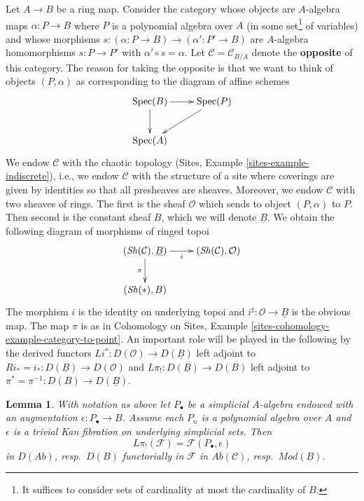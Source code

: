 \documentclass{stacks-project}
\theoremstyle{plain}
\newtheorem{lemma}[subsection]{Lemma}
\theoremstyle{definition}
\theoremstyle{remark}
\numberwithin{equation}{subsection}
\def\Spec{\mathop{\mathrm{Spec}}}
\def\Sh{\mathop{\mathit{Sh}}\nolimits}
\begin{document}
\noindent
Let $A \to B$ be a ring map. Consider the category whose objects are
$A$-algebra maps $\alpha : P \to B$ where $P$ is a polynomial algebra over $A$
(in some set\footnote{It suffices to consider sets of cardinality
at most the cardinality of $B$.} of variables) and whose
morphisms $s : (\alpha : P \to B) \to (\alpha' : P' \to B)$ are
$A$-algebra homomorphisms $s : P \to P'$ with $\alpha' \circ s = \alpha$.
Let $\mathcal{C} = \mathcal{C}_{B/A}$ denote the {\bf opposite}
of this category. The reason for
taking the opposite is that we want to think of objects
$(P, \alpha)$ as corresponding to the diagram of affine schemes
$$
\xymatrix{
\Spec(B) \ar[d] \ar[r] & \Spec(P) \ar[ld] \\
\Spec(A)
}
$$
We endow $\mathcal{C}$ with the chaotic topology
(Sites, Example \ref{sites-example-indiscrete}), i.e., we endow
$\mathcal{C}$ with the structure of a site where coverings are given by
identities so that all presheaves are sheaves.
Moreover, we endow $\mathcal{C}$ with two sheaves of rings. The first
is the sheaf $\mathcal{O}$ which sends to object $(P, \alpha)$ to $P$.
Then second is the constant sheaf $B$, which we will denote
$\underline{B}$. We obtain the following diagram of morphisms of
ringed topoi
\begin{equation}
\label{equation-pi}
\vcenter{
\xymatrix{
(\Sh(\mathcal{C}), \underline{B}) \ar[r]_i \ar[d]_\pi &
(\Sh(\mathcal{C}), \mathcal{O}) \\
(\Sh(*), B)
}
}
\end{equation}
The morphism $i$ is the identity on underlying topoi and
$i^\sharp : \mathcal{O} \to \underline{B}$ is the obvious map.
The map $\pi$ is as in Cohomology on Sites, Example
\ref{sites-cohomology-example-category-to-point}.
An important role will be played in the following
by the derived functors
$
Li^* : D(\mathcal{O}) \longrightarrow D(\underline{B})
$
left adjoint to $Ri_* = i_* : D(\underline{B}) \to D(\mathcal{O})$ and
$
L\pi_! : D(\underline{B}) \longrightarrow D(B)
$
left adjoint to $\pi^* = \pi^{-1} : D(B) \to D(\underline{B})$.

\begin{lemma}
\label{lemma-identify-pi-shriek}
With notation as above let $P_\bullet$ be a simplicial $A$-algebra
endowed with an augmentation $\epsilon : P_\bullet \to B$.
Assume each $P_n$ is a polynomial algebra over $A$ and $\epsilon$
is a trivial Kan fibration on underlying simplicial sets. Then
$$
L\pi_!(\mathcal{F}) = \mathcal{F}(P_\bullet, \epsilon)
$$
in $D(\textit{Ab})$, resp.\ $D(B)$ functorially in $\mathcal{F}$ in
$\textit{Ab}(\mathcal{C})$, resp.\ $\textit{Mod}(\underline{B})$.
\end{lemma}
\end{document}
